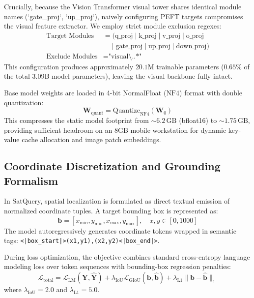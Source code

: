 \documentclass[lettersize,journal]{IEEEtran}
\begin{document}
Crucially, because the Vision Transformer visual tower shares identical module names (`gate\_proj`, `up\_proj`), naively configuring PEFT targets compromises the visual feature extractor. We employ strict module exclusion regexes:
\begin{align}
\text{Target Modules} &= (\text{q\_proj} \mid \text{k\_proj} \mid \text{v\_proj} \mid \text{o\_proj} \nonumber \\
&\quad \mid \text{gate\_proj} \mid \text{up\_proj} \mid \text{down\_proj}) \\
\text{Exclude Modules} &= \text{"visual\textbackslash..*"}
\end{align}
This configuration produces approximately $20.1\text{M}$ trainable parameters ($0.65\%$ of the total 3.09B model parameters), leaving the visual backbone fully intact.

Base model weights are loaded in 4-bit NormalFloat ($\text{NF4}$) format with double quantization:
\begin{equation}
\mathbf{W}_{\text{quant}} = \text{Quantize}_{\text{NF4}}(\mathbf{W}_0)
\end{equation}
This compresses the static model footprint from $\sim 6.2\,\text{GB}$ (bfloat16) to $\sim 1.75\,\text{GB}$, providing sufficient headroom on an 8GB mobile workstation for dynamic key-value cache allocation and image patch embeddings.

\subsection{Coordinate Discretization and Grounding Formalism}
In SatQuery, spatial localization is formulated as direct textual emission of normalized coordinate tuples. A target bounding box is represented as:
\begin{equation}
\mathbf{b} = [x_{\min}, y_{\min}, x_{\max}, y_{\max}], \quad x, y \in [0, 1000]
\end{equation}
The model autoregressively generates coordinate tokens wrapped in semantic tags: \texttt{<|box\_start|>(x1,y1),(x2,y2)<|box\_end|>}.

During loss optimization, the objective combines standard cross-entropy language modeling loss over token sequences with bounding-box regression penalties:
\begin{equation}
\mathcal{L}_{\text{total}} = \mathcal{L}_{\text{LM}}(\mathbf{Y}, \hat{\mathbf{Y}}) + \lambda_{\text{IoU}} \mathcal{L}_{\text{GIoU}}(\mathbf{b}, \hat{\mathbf{b}}) + \lambda_{\text{L1}} \|\mathbf{b} - \hat{\mathbf{b}}\|_1
\end{equation}
where $\lambda_{\text{IoU}} = 2.0$ and $\lambda_{\text{L1}} = 5.0$.
\end{document}
